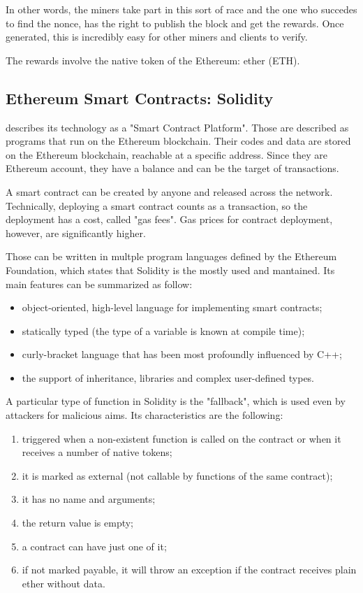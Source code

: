 In other words, the miners take part in this sort of race and the one who succedes to find the nonce, has the right to publish the block and get the rewards. 
Once generated, this is incredibly easy for other miners and clients to verify. 

The rewards involve the native token of the Ethereum: ether (ETH). 

\subsection{Ethereum Smart Contracts: Solidity}
\citet{EthDocs} describes its technology as a "Smart Contract Platform".
Those are described as programs that run on the Ethereum blockchain. 
Their codes and data are stored on the Ethereum blockchain, reachable at a specific address.
Since they are Ethereum account, they have a balance and can be the target of transactions. 

A smart contract can be created by anyone and released across the network.
Technically, deploying a smart contract counts as a transaction, so the deployment has a cost, called "gas fees".
Gas prices for contract deployment, however, are significantly higher. 

Those can be written in multple program languages defined by the Ethereum Foundation, which states that Solidity is the mostly used and mantained.
Its main features can be summarized as follow: 
\begin{itemize}
    \item object-oriented, high-level language for implementing smart contracts;
    \item statically typed (the type of a variable is known at compile time);
    \item curly-bracket language that has been most profoundly influenced by C++;
    \item the support of inheritance, libraries and complex user-defined types.
\end{itemize}

A particular type of function in Solidity is the "fallback", which is used even by attackers for malicious aims. 
Its characteristics are the following: 
\begin{enumerate}
    \item triggered when a non-existent function is called on the contract or when it receives a number of native tokens;
    \item it is marked as external (not callable by functions of the same contract);
    \item it has no name and arguments;
    \item the return value is empty;
    \item a contract can have just one of it;
    \item if not marked payable, it will throw an exception if the contract receives plain ether without data.
\end{enumerate}

